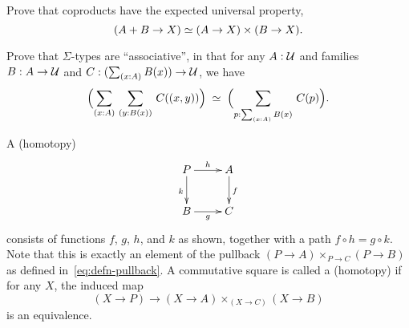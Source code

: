 \documentclass[hott-all.tex]{subfiles}
\begin{document}
%
%

\begin{ex}\label{ex:coprod-ump}
  Prove that coproducts have the expected universal property,
  \[ (A+B \to X) \simeq (A\to X)\times (B\to X). \]
\end{ex}
%
\begin{ex}\label{ex:sigma-assoc}
  Prove that $\Sigma$-types are ``associative'',
  in that for any $A:\mathcal{U}$ and families $B:A\to\mathcal{U}$ and $C:(\sm{x:A} B(x))\to\UU$, we have
  \[\eqvspaced{\Parens{\sm{x:A}{y:B(x)} C(\pairr{x,y})}}{\Parens{\sm{p:\sm{x:A}B(x)} C(p)}}. \]
\end{ex}
%
\begin{ex}\label{ex:pullback}
  A (homotopy) 
  \begin{equation*}
  \vcenter{\xymatrix{
      P\ar[r]^h\ar[d]_k &
      A\ar[d]^f\\
      B\ar[r]_g &
      C
      }}
  \end{equation*}
  consists of functions $f$, $g$, $h$, and $k$ as shown, together with a path $f \circ h= g \circ k$.
  Note that this is exactly an element of the pullback $(P\to A) \times_{P\to C} (P\to B)$ as defined in~\eqref{eq:defn-pullback}.
  A commutative square is called a (homotopy) 
  if for any $X$, the induced map
  \[ (X\to P) \to (X\to A) \times_{(X\to C)} (X\to B) \]
  is an equivalence.
\end{ex}
%
\end{document}
